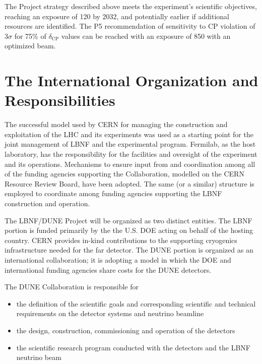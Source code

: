 \vspace{6pt}
The Project strategy described above meets the experiment's scientific objectives,
 reaching an exposure of 
\num{120}\ktMWyr{} by 2032, and potentially earlier if additional resources are identified. 
The P5 recommendation of sensitivity to CP violation of 3$\sigma$ for 75\% of $\delta_\text{CP}$
values can be reached with an exposure of \num{850}\ktMWyr{} with an optimized beam.

\section{The International Organization and Responsibilities}

The successful model used by CERN for managing the construction and exploitation of the LHC and its experiments was used as a starting point for the joint management of LBNF and the experimental program.  Fermilab, as the host laboratory, has the responsibility for the facilities and oversight of the experiment and its operations.  Mechanisms to ensure input from and coordination among all of the funding agencies supporting the Collaboration, modelled on the CERN Resource Review Board, have been adopted. The same (or a similar) structure is employed to coordinate among funding agencies supporting the LBNF construction and operation.  

The LBNF/DUNE Project will be organized as two distinct entities. The LBNF portion is funded primarily
by the the U.S. DOE acting on behalf of the hosting country.  CERN provides in-kind contributions to the supporting cryogenics infrastructure needed for the far detector. The DUNE portion is organized
as an international collaboration; it is adopting a model in which the DOE and international funding agencies share costs %
for the DUNE detectors.

The DUNE Collaboration is responsible for
\begin{itemize}
\item the definition of the scientific goals and corresponding scientific and technical requirements on the detector systems and neutrino beamline
\item the design, construction, commissioning and operation of the detectors
\item the scientific research program conducted with the detectors and the LBNF neutrino beam
\end{itemize}

